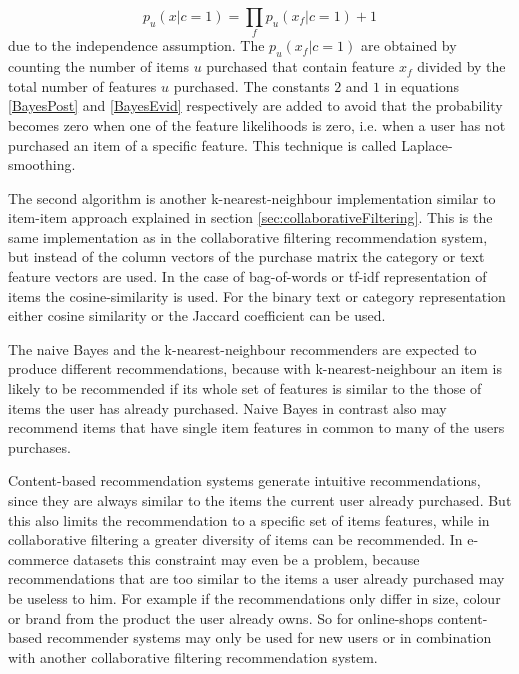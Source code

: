 \documentclass[10pt]{reportMaster}
\begin{document}
\begin{equation}
\label{BayesEvid}
p_u(x|c=1) = \prod_f{p_u(x_f|c=1)+1}
\end{equation}
due to the independence assumption.
The $p_u(x_f|c=1)$ are obtained by counting the number of items $u$ purchased that contain feature $x_f$ divided by the total number of features $u$ purchased.
The constants $2$ and $1$ in equations \ref{BayesPost} and \ref{BayesEvid} respectively are added to avoid that the probability becomes zero when one of the feature likelihoods is zero, i.e. when a user has not purchased an item of a specific feature.
This technique is called Laplace-smoothing. %

The second algorithm is another k-nearest-neighbour implementation similar to item-item approach explained in section \ref{sec:collaborativeFiltering}.
This is the same implementation as in the collaborative filtering recommendation system, but instead of the column vectors of the purchase matrix the category or text feature vectors are used.
In the case of bag-of-words or tf-idf representation of items the cosine-similarity is used.
For the binary text or category representation either cosine similarity or the Jaccard coefficient can be used.

The naive Bayes and the k-nearest-neighbour recommenders are expected to produce different recommendations, because with k-nearest-neighbour an item is likely to be recommended if its whole set of features is similar to the those of items the user has already purchased.
Naive Bayes in contrast also may recommend items that have single item features in common to many of the users purchases.

Content-based recommendation systems generate intuitive recommendations, since they are always similar to the items the current user already purchased.
But this also limits the recommendation to a specific set of items features, while in collaborative filtering a greater diversity of items can be recommended.
In e-commerce datasets this constraint may even be a problem, because recommendations that are too similar to the items a user already purchased may be useless to him.
For example if the recommendations only differ in size, colour or brand from the product the user already owns.
So for online-shops content-based recommender systems may only be used for new users or in combination with another collaborative filtering recommendation system. %

\end{document}
